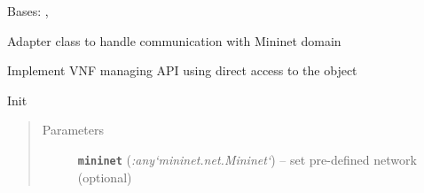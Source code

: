 \documentclass[letterpaper,10pt,english]{sphinxmanual}
\begin{document}
\begin{fulllineitems}
\label{adapt/domain_adapters:escape.adapt.domain_adapters.MininetDomainAdapter}
Bases: {\hyperref[util/adapter:escape.util.adapter.AbstractDomainAdapter]{\emph{}}}, {\hyperref[util/adapter:escape.util.adapter.VNFStarterAPI]{\emph{}}}

Adapter class to handle communication with Mininet domain

Implement VNF managing API using direct access to the
 object

\begin{fulllineitems}
\label{adapt/domain_adapters:escape.adapt.domain_adapters.MininetDomainAdapter._eventMixin_events}
\end{fulllineitems}


\begin{fulllineitems}
\label{adapt/domain_adapters:escape.adapt.domain_adapters.MininetDomainAdapter.name}
\end{fulllineitems}


\begin{fulllineitems}
\label{adapt/domain_adapters:escape.adapt.domain_adapters.MininetDomainAdapter.__init__}
Init
\begin{quote}\begin{description}
\item[{Parameters}] \leavevmode
\textbf{\texttt{mininet}} (\emph{:any{}`mininet.net.Mininet{}`}) -- set pre-defined network (optional)

\end{description}\end{quote}


\end{fulllineitems}
\end{fulllineitems}
\end{document}

